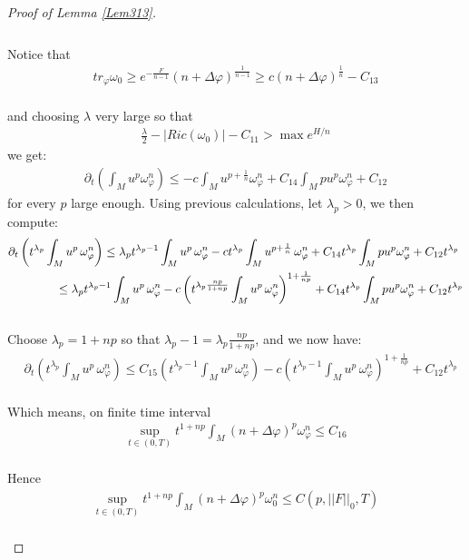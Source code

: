 \documentclass[11pt]{amsart}
\numberwithin{equation}{section}
\begin{document}
\begin{proof}[Proof of Lemma \ref{Lem313}]
\begin{align}
\end{align}\\
Notice that
\begin{align}
	tr_{\varphi} \omega_0 \ge  e^{-\frac{F}{n-1}} (n + \Delta\varphi)^{\frac{1}{n-1}} \ge  c (n+\Delta\varphi)^{\frac{1}{n}}-C_{13}
\end{align}\\
and choosing $\lambda$ very large so that
\begin{align}
	\frac{\lambda}{2}-|Ric(\omega_0)|-C_{11}> \max e^{H/n}
\end{align}
we get:
\begin{align}
	\partial_t\left( \int_M u^p \omega_{\varphi}^n \right) \le  -c \int_M u^{p + \frac{1}{n}} \omega_{\varphi}^n + C_{14}\int_M p u^p \omega_{\varphi}^n + C_{12} 
\end{align}
for every $p$ large enough. Using previous calculations, let \( \lambda_p > 0 \), we then compute:
\begin{align}
	& \partial_t \left( t^{\lambda_p} \int_M u^p \, \omega_{\varphi}^n \right) \le  \lambda_p t^{\lambda_p - 1} \int_M u^p \, \omega_{\varphi}^n - c t^{\lambda_p} \int_M u^{p + \frac{1}{n}} \, \omega_{\varphi}^n + C_{14}t^{\lambda_p} \int_M p u^p \omega_{\varphi}^n + C_{12}t^{\lambda_p}  \notag \\
	&\qquad\qquad \le  \lambda_p t^{\lambda_p - 1} \int_M u^p \, \omega_{\varphi}^n - c \left( t^{\lambda_p \frac{np}{1 + np}} \int_M u^p \, \omega_{\varphi}^n \right)^{1 + \frac{1}{np}} + C_{14}t^{\lambda_p} \int_M p u^p \omega_{\varphi}^n + C_{12}t^{\lambda_p} 
\end{align}\\
Choose \( \lambda_p = 1 + np \) so that \( \lambda_p - 1 = \lambda_p \frac{np}{1 + np} \), and we now have:
\begin{align}
	&\partial_t \left( t^{\lambda_p} \int_M u^p \, \omega_{\varphi}^n \right) \le  C_{15} \left( t^{\lambda_p-1} \int_M u^p \, \omega_{\varphi}^n \right) - c \left( t^{\lambda_p-1} \int_M u^p \, \omega_{\varphi}^n \right)^{1 + \frac{1}{np}} + C_{12} t^{\lambda_p}
\end{align}\\
Which means, on finite time interval
\begin{align}
	\sup_{t \in (0,T)} t^{1 + np} \int_M (n + \Delta\varphi)^p \omega_{\varphi}^n \le  C_{16}
\end{align}\\
Hence 
\begin{align}
	\sup_{t \in (0,T)} t^{1 + np} \int_M (n + \Delta\varphi)^p \omega_{0}^n \le  C(p,||F||_0,T)
\end{align}\\
\end{proof}
\end{document}
